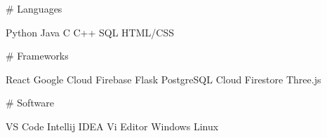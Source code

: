 # Languages

Python
Java
C
C++
SQL
HTML/CSS


# Frameworks

React
Google Cloud
Firebase
Flask
PostgreSQL
Cloud Firestore
Three.js


# Software

VS Code
Intellij IDEA
Vi Editor
Windows
Linux